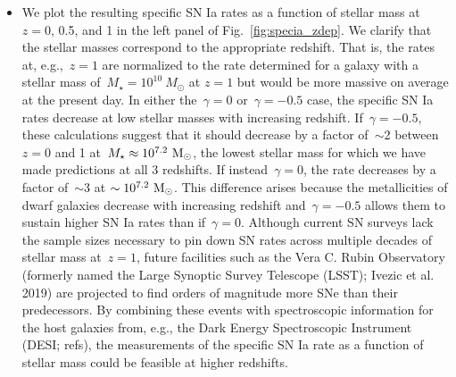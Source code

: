 \documentclass[ms.tex]{subfiles}
\begin{document}
\begin{itemize}
	\item We plot the resulting specific SN Ia rates as a function of stellar
	mass at~$z = 0$, 0.5, and 1 in the left panel of Fig.~\ref{fig:specia_zdep}.
	We clarify that the stellar masses correspond to the appropriate redshift.
	That is, the rates at, e.g.,~$z = 1$ are normalized to the rate determined
	for a galaxy with a stellar mass of~$M_\star = 10^{10}~M_\odot$ at $z = 1$
	but would be more massive on average at the present day.
	In either the~$\gamma = 0$ or~$\gamma = -0.5$ case, the specific SN Ia
	rates decrease at low stellar masses with increasing redshift.
	If~$\gamma = -0.5$, these calculations suggest that it should decrease by a
	factor of~$\sim$2 between~$z = 0$ and 1 at~$M_\star \approx 10^{7.2}~\text{M}_\odot$,
	the lowest stellar mass for which we have made predictions at all 3
	redshifts.
	If instead~$\gamma = 0$, the rate decreases by a factor of~$\sim$3 at
	$\sim10^{7.2}~\text{M}_\odot$.
	This difference arises because the metallicities of dwarf galaxies decrease
	with increasing redshift and~$\gamma = -0.5$ allows them to sustain higher
	SN Ia rates than if~$\gamma = 0$.
	Although current SN surveys lack the sample sizes necessary to pin down SN
	rates across multiple decades of stellar mass at~$z = 1$, future
	facilities such as the Vera C. Rubin Observatory (formerly named the Large
	Synoptic Survey Telescope (LSST); {\color{red} Ivezic et al. 2019}) are
	projected to find orders of magnitude more SNe than their predecessors.
	By combining these events with spectroscopic information for the host
	galaxies from, e.g., the Dark Energy Spectroscopic Instrument (DESI;
	{\color{red} refs}), the measurements of the specific SN Ia rate as a
	function of stellar mass could be feasible at higher redshifts.


\end{itemize}
\end{document}

